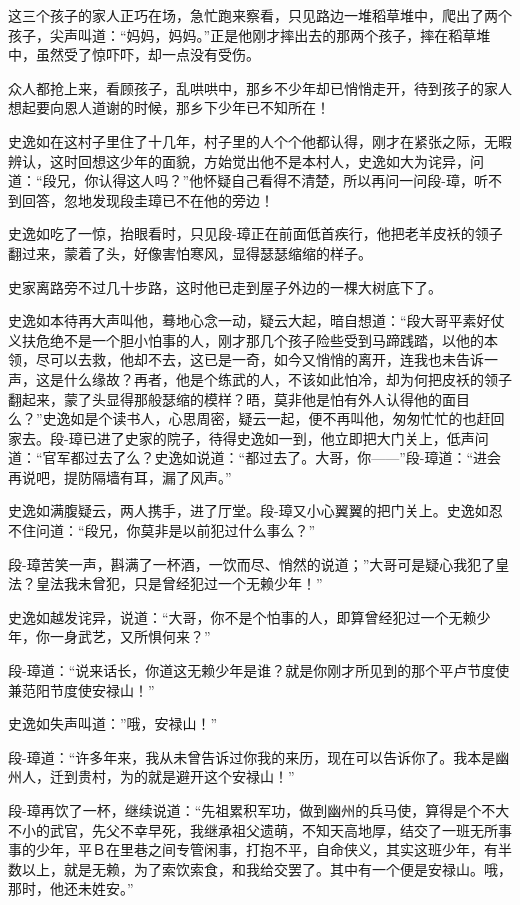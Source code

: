 \documentclass[12pt,oneside]{book}
\begin{document}
这三个孩子的家人正巧在场，急忙跑来察看，只见路边一堆稻草堆中，爬出了两个孩子，尖声叫道：``妈妈，妈妈。''正是他刚才摔出去的那两个孩子，摔在稻草堆中，虽然受了惊吓吓，却一点没有受伤。

众人都抢上来，看顾孩子，乱哄哄中，那乡不少年却已悄悄走开，待到孩子的家人想起要向恩人道谢的时候，那乡下少年已不知所在！

史逸如在这村子里住了十几年，村子里的人个个他都认得，刚才在紧张之际，无暇辨认，这时回想这少年的面貌，方始觉出他不是本村人，史逸如大为诧异，问道：``段兄，你认得这人吗？''他怀疑自己看得不清楚，所以再问一问段-璋，听不到回答，忽地发现段圭璋已不在他的旁边！

史逸如吃了一惊，抬眼看时，只见段-璋正在前面低首疾行，他把老羊皮袄的领子翻过来，蒙着了头，好像害怕寒风，显得瑟瑟缩缩的样子。

史家离路旁不过几十步路，这时他已走到屋子外边的一棵大树底下了。

史逸如本待再大声叫他，蓦地心念一动，疑云大起，暗自想道：``段大哥平素好仗义扶危绝不是一个胆小怕事的人，刚才那几个孩子险些受到马蹄践踏，以他的本领，尽可以去救，他却不去，这已是一奇，如今又悄悄的离开，连我也未告诉一声，这是什么缘故？再者，他是个练武的人，不该如此怕冷，却为何把皮袄的领子翻起来，蒙了头显得那般瑟缩的模样？晤，莫非他是怕有外人认得他的面目么？''史逸如是个读书人，心思周密，疑云一起，便不再叫他，匆匆忙忙的也赶回家去。段-璋已进了史家的院子，待得史逸如一到，他立即把大门关上，低声问道：``官军都过去了么？史逸如说道：``都过去了。大哥，你------''段-璋道：``进会再说吧，提防隔墙有耳，漏了风声。''

史逸如满腹疑云，两人携手，进了厅堂。段-璋又小心翼翼的把门关上。史逸如忍不住问道：``段兄，你莫非是以前犯过什么事么？''

段-璋苦笑一声，斟满了一杯酒，一饮而尽、悄然的说道；''大哥可是疑心我犯了皇法？皇法我未曾犯，只是曾经犯过一个无赖少年！''

史逸如越发诧异，说道：``大哥，你不是个怕事的人，即算曾经犯过一个无赖少年，你一身武艺，又所惧何来？''

段-璋道：``说来话长，你道这无赖少年是谁？就是你刚才所见到的那个平卢节度使兼范阳节度使安禄山！''

史逸如失声叫道：''哦，安禄山！''

段-璋道：``许多年来，我从未曾告诉过你我的来历，现在可以告诉你了。我本是幽州人，迁到贵村，为的就是避开这个安禄山！''

段-璋再饮了一杯，继续说道：``先祖累积军功，做到幽州的兵马使，算得是个不大不小的武官，先父不幸早死，我继承祖父遗萌，不知天高地厚，结交了一班无所事事的少年，平Ｂ在里巷之间专管闲事，打抱不平，自命侠义，其实这班少年，有半数以上，就是无赖，为了索饮索食，和我给交罢了。其中有一个便是安禄山。哦，那时，他还未姓安。''
\end{document}
